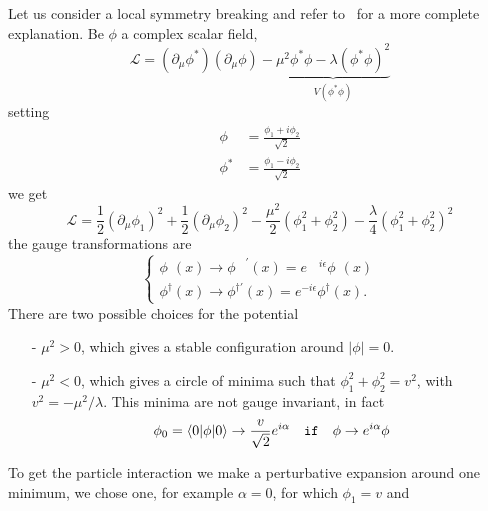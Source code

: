 Let us consider a local symmetry breaking and refer to~\cite{martin:particle}
for a more complete explanation. Be $\phi$ a complex scalar field,
\begin{equation}
  \label{eq:25}
  \mathcal{L} = (\partial_{\mu} \phi^{*})(\partial_{\mu} \phi) -
  \underbrace{\mu^{2}\phi^{*}\phi - \lambda(\phi^{*}\phi)^{2}}_{V(\phi^{*}\phi)}
\end{equation}
setting
\begin{equation}
  \label{eq:26}
  \begin{split}
    \phi^{\phantom{*}} &= \frac{\phi_{1} + i \phi_{2}}{\sqrt{2}} \\
    \phi^{*} &= \frac{\phi_{1} - i \phi_{2}}{\sqrt{2}}
  \end{split}
\end{equation}
we get
\begin{equation}
  \label{eq:27}
  \mathcal{L} = \frac{1}{2} (\partial_{\mu} \phi_{1})^{2} +
  \frac{1}{2} ( \partial_{\mu} \phi_{2} )^{2} - \frac{\mu^{2}}{2} (
  \phi_{1}^{2} + \phi_{2}^{2} ) - \frac{\lambda}{4} ( \phi_{1}^{2} +
  \phi_{2}^{2} )^{2}
\end{equation}
the gauge transformations are
\begin{equation}
  \label{eq:28}
  \begin{cases}
    \phi^{\phantom{\dagger}}(x) \rightarrow \phi^{\phantom{\dagger}'}(x) =
    e^{\phantom{-} i \epsilon}
    \phi^{\phantom{\dagger}}(x) \\
    \phi^{\dagger} (x) \rightarrow \phi^{\dagger '} (x) = e^{- i \epsilon}
    \phi^{\dagger}(x).
  \end{cases}
\end{equation}
There are two possible choices for the potential
\begin{itemize}
\item[-] $\mu^{2} > 0$, which gives a stable configuration around $|\phi| = 0$.
\item[-] $\mu^{2} < 0$, which gives a circle of minima such that
  $\phi_{1}^{2} + \phi_{2}^{2} = v^{2}$, with $v^{2} = - \mu^{2} /
  \lambda$. This minima are not gauge invariant, in fact
  \begin{equation}
    \label{eq:29}
    \phi_{0} = \langle 0| \phi |0\rangle \rightarrow \frac{v}{\sqrt{2}} e^{i
      \alpha} \quad \mathtt{if} \quad \phi \rightarrow e^{i \alpha} \phi
  \end{equation}
\end{itemize}
To get the particle interaction we make a perturbative expansion around one
minimum, we chose one, for example $\alpha = 0$, for which $\phi_{1} = v$ and
